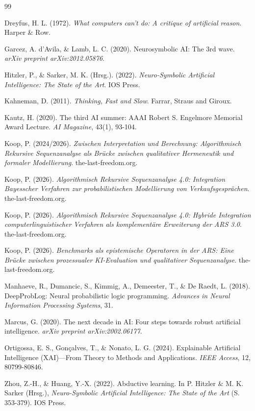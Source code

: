 \documentclass[12pt,a4paper]{article}
\begin{document}
\newpage
\begin{thebibliography}{99}

Dreyfus, H. L. (1972). \textit{What computers can't do: A critique of artificial 
reason}. Harper \& Row.

Garcez, A. d'Avila, \& Lamb, L. C. (2020). Neurosymbolic AI: The 3rd wave. 
\textit{arXiv preprint arXiv:2012.05876}.

Hitzler, P., \& Sarker, M. K. (Hrsg.). (2022). \textit{Neuro-Symbolic Artificial 
Intelligence: The State of the Art}. IOS Press.

Kahneman, D. (2011). \textit{Thinking, Fast and Slow}. Farrar, Straus and Giroux.

Kautz, H. (2020). The third AI summer: AAAI Robert S. Engelmore Memorial Award 
Lecture. \textit{AI Magazine}, 43(1), 93-104.

Koop, P. (2024/2026). \textit{Zwischen Interpretation und Berechnung: Algorithmisch 
Rekursive Sequenzanalyse als Brücke zwischen qualitativer Hermeneutik und formaler 
Modellierung}. the-last-freedom.org.

Koop, P. (2026). \textit{Algorithmisch Rekursive Sequenzanalyse 4.0: Integration 
Bayesscher Verfahren zur probabilistischen Modellierung von Verkaufsgesprächen}. 
the-last-freedom.org.

Koop, P. (2026). \textit{Algorithmisch Rekursive Sequenzanalyse 4.0: Hybride 
Integration computerlinguistischer Verfahren als komplementäre Erweiterung der 
ARS 3.0}. the-last-freedom.org.

Koop, P. (2026). \textit{Benchmarks als epistemische Operatoren in der ARS: 
Eine Brücke zwischen prozessualer KI-Evaluation und qualitativer Sequenzanalyse}. 
the-last-freedom.org.

Manhaeve, R., Dumancic, S., Kimmig, A., Demeester, T., \& De Raedt, L. (2018). 
DeepProbLog: Neural probabilistic logic programming. \textit{Advances in Neural 
Information Processing Systems}, 31.

Marcus, G. (2020). The next decade in AI: Four steps towards robust artificial 
intelligence. \textit{arXiv preprint arXiv:2002.06177}.

Ortigossa, E. S., Gonçalves, T., \& Nonato, L. G. (2024). Explainable Artificial 
Intelligence (XAI)—From Theory to Methods and Applications. \textit{IEEE Access}, 
12, 80799-80846.

Zhou, Z.-H., \& Huang, Y.-X. (2022). Abductive learning. In P. Hitzler \& 
M. K. Sarker (Hrsg.), \textit{Neuro-Symbolic Artificial Intelligence: The State 
of the Art} (S. 353-379). IOS Press.

\end{thebibliography}
\end{document}
